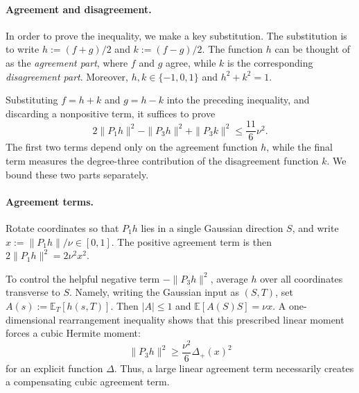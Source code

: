 \paragraph{Agreement and disagreement.}
In order to prove the inequality, we make a key substitution. The substitution is to write
\(h:=(f+g)/2\) and \(k:=(f-g)/2\). The function \(h\) can be thought of as the \textit{agreement part}, where \(f\) and \(g\) agree, while \(k\) is the corresponding \textit{disagreement part}. Moreover,
\(h,k\in\{-1,0,1\}\) and \(h^2+k^2=1\).

Substituting \(f=h+k\) and \(g=h-k\) into the preceding inequality, and discarding a nonpositive term, it suffices to prove
\begin{equation}
    2\|P_1h\|^2-\|P_3h\|^2+\|P_3k\|^2
    \leq \frac{11}{6}\nu^2.
    \label{eq:agreement-disagreement-reduction}
\end{equation}
The first two terms depend only on the agreement function \(h\), while the final term measures the degree-three contribution of the disagreement function \(k\). We bound these two parts separately.


\paragraph{Agreement terms.}
Rotate coordinates so that \(P_1h\) lies in a single Gaussian direction \(S\), and write
\(x:=\|P_1h\|/\nu\in[0,1]\). The positive agreement term is then
\(2\|P_1h\|^2=2\nu^2x^2\).

To control the helpful negative term \(-\|P_3h\|^2\), average \(h\) over all coordinates transverse to \(S\). Namely, writing the Gaussian input as \((S,T)\), set
\(A(s):=\mathbb E_T[h(s,T)]\). Then \(|A|\leq1\) and
\(\mathbb E[A(S)S]=\nu x\). A one-dimensional rearrangement inequality shows that this prescribed linear moment forces a cubic Hermite moment:
\[
    \|P_3h\|^2
    \geq
    \frac{\nu^2}{6}\Delta_+(x)^2
\]
for an explicit function \(\Delta\). Thus, a large linear agreement term necessarily creates a compensating cubic agreement term.

